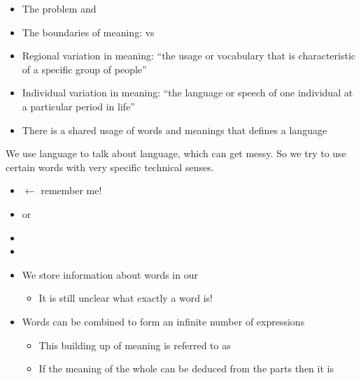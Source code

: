 \documentclass[headrule,footrule]{foils}
\begin{document}

\begin{itemize}
\item The  problem and 
\item The boundaries of meaning:  vs 
\item Regional variation in meaning:  ``the usage or vocabulary that is characteristic of a specific group of people''
\item Individual variation in meaning: 
 ``the language or speech of one individual at a
particular period in life''
\item There is a shared usage of words and meanings that defines a language
\end{itemize}


We use language to talk about language, which can get messy.  So we
try to use certain words with very specific technical senses.

\begin{itemize}
\item {} $\leftarrow$ remember me!
\item {} or 
\item {}
\item {}
\end{itemize}


\begin{itemize}
\item We store information about words in our 
  \begin{itemize}
  \item It is still unclear what exactly a word is!
  \end{itemize}
\item Words can be combined to form an infinite number of expressions
  \begin{itemize}
  \item This building up of meaning is referred to as 
  \item If the meaning of the whole can be deduced from the parts then it is 
  \end{itemize}
\end{itemize}
\end{document}
